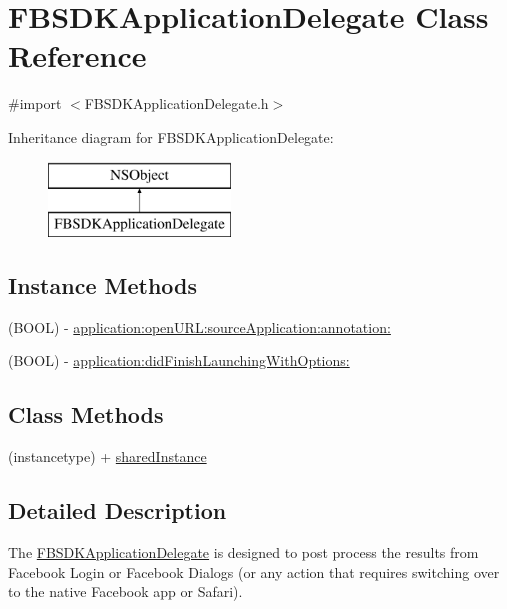 \hypertarget{interface_f_b_s_d_k_application_delegate}{}\section{F\+B\+S\+D\+K\+Application\+Delegate Class Reference}
\label{interface_f_b_s_d_k_application_delegate}


{\ttfamily \#import $<$F\+B\+S\+D\+K\+Application\+Delegate.\+h$>$}

Inheritance diagram for F\+B\+S\+D\+K\+Application\+Delegate\+:\begin{figure}[H]
\begin{center}
\leavevmode
\includegraphics[height=2.000000cm]{interface_f_b_s_d_k_application_delegate}
\end{center}
\end{figure}
\subsection*{Instance Methods}
\begin{DoxyCompactItemize}
\item 
(B\+O\+O\+L) -\/ \hyperlink{interface_f_b_s_d_k_application_delegate_ab2a10892909e3ffa759a8bc854601de6}{application\+:open\+U\+R\+L\+:source\+Application\+:annotation\+:}
\item 
(B\+O\+O\+L) -\/ \hyperlink{interface_f_b_s_d_k_application_delegate_aa5477a6512bacb13b5f485027a2b4c53}{application\+:did\+Finish\+Launching\+With\+Options\+:}
\end{DoxyCompactItemize}
\subsection*{Class Methods}
\begin{DoxyCompactItemize}
\item 
(instancetype) + \hyperlink{interface_f_b_s_d_k_application_delegate_ad9db7fbd72d8cccf675e91ee9fba2ee1}{shared\+Instance}
\end{DoxyCompactItemize}


\subsection{Detailed Description}
The \hyperlink{interface_f_b_s_d_k_application_delegate}{F\+B\+S\+D\+K\+Application\+Delegate} is designed to post process the results from Facebook Login or Facebook Dialogs (or any action that requires switching over to the native Facebook app or Safari).


